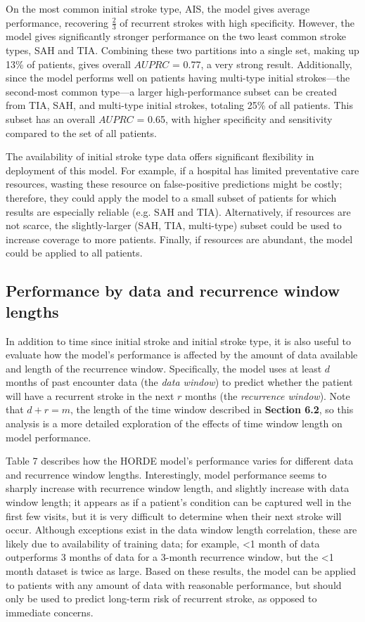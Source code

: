 \documentclass{article}
\begin{document}
On the most common initial stroke type, AIS, the model gives average performance, recovering $\frac{2}{3}$ of recurrent strokes with high specificity. However, the model gives significantly stronger performance on the two least common stroke types, SAH and TIA. Combining these two partitions into a single set, making up 13\% of patients, gives overall $AUPRC$ = 0.77, a very strong result. Additionally, since the model performs well on patients having multi-type initial strokes---the second-most common type---a larger high-performance subset can be created from TIA, SAH, and multi-type initial strokes, totaling 25\% of all patients. This subset has an overall $AUPRC$ = 0.65, with higher specificity and sensitivity compared to the set of all patients.  

The availability of initial stroke type data offers significant flexibility in deployment of this model. For example, if a hospital has limited preventative care resources, wasting these resource on false-positive predictions might be costly; therefore, they could apply the model to a small subset of patients for which results are especially reliable (e.g. SAH and TIA). Alternatively, if resources are not scarce, the slightly-larger (SAH, TIA, multi-type) subset could be used to increase coverage to more patients. Finally, if resources are abundant, the model could be applied to all patients.

\subsection{Performance by data and recurrence window lengths}

In addition to time since initial stroke and initial stroke type, it is also useful to evaluate how the model's performance is affected by the amount of data available and length of the recurrence window. Specifically, the model uses at least $d$ months of past encounter data (the \textit{data window}) to predict whether the patient will have a recurrent stroke in the next $r$ months (the \textit{recurrence window}). Note that $d+r=m$, the length of the time window described in \textbf{Section 6.2}, so this analysis is a more detailed exploration of the effects of time window length on model performance.

Table 7 describes how the HORDE model's performance varies for different data and recurrence window lengths. Interestingly, model performance seems to sharply increase with recurrence window length, and slightly increase with data window length; it appears as if a patient's condition can be captured well in the first few visits, but it is very difficult to determine when their next stroke will occur. Although exceptions exist in the data window length correlation, these are likely due to availability of training data; for example, <1 month of data outperforms 3 months of data for a 3-month recurrence window, but the <1 month dataset is twice as large. Based on these results, the model can be applied to patients with any amount of data with reasonable performance, but should only be used to predict long-term risk of recurrent stroke, as opposed to immediate concerns.
\end{document}
